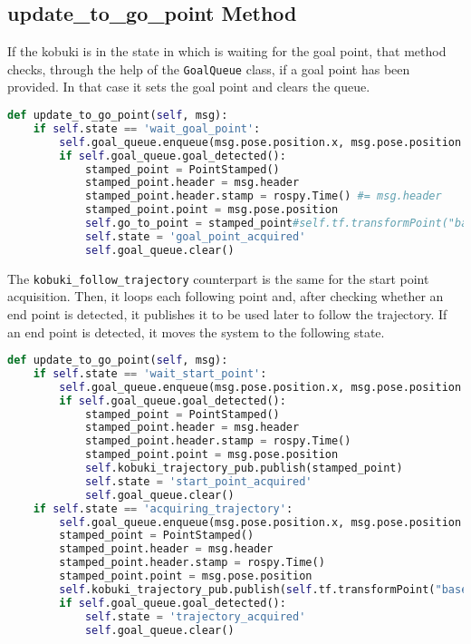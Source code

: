 \subsection*{update\_to\_go\_point Method}
If the kobuki is in the state in which is waiting for the goal point, that method checks, through the help of the \texttt{GoalQueue} class, if a goal point has been provided. In that case it sets the goal point and clears the queue.
\begin{lstlisting}[caption={Update To Go Point},label={lst:updatetogopoint},language=Python]
def update_to_go_point(self, msg):
    if self.state == 'wait_goal_point':
        self.goal_queue.enqueue(msg.pose.position.x, msg.pose.position.y)
        if self.goal_queue.goal_detected():
            stamped_point = PointStamped()
            stamped_point.header = msg.header
            stamped_point.header.stamp = rospy.Time() #= msg.header
            stamped_point.point = msg.pose.position
            self.go_to_point = stamped_point#self.tf.transformPoint("base_link", stamped_point)
            self.state = 'goal_point_acquired'
            self.goal_queue.clear()
\end{lstlisting}
The \texttt{kobuki\_follow\_trajectory} counterpart is the same for the start point acquisition. Then, it loops each following point and, after checking whether an end point is detected, it publishes it to be used later to follow the trajectory. If an end point is detected, it moves the system to the following state.
\begin{lstlisting}[caption={Update To Go Point},label={lst:updatetogopoint2},language=Python]
def update_to_go_point(self, msg):
    if self.state == 'wait_start_point':
        self.goal_queue.enqueue(msg.pose.position.x, msg.pose.position.y)
        if self.goal_queue.goal_detected():
            stamped_point = PointStamped()
            stamped_point.header = msg.header
            stamped_point.header.stamp = rospy.Time()
            stamped_point.point = msg.pose.position
            self.kobuki_trajectory_pub.publish(stamped_point)
            self.state = 'start_point_acquired'
            self.goal_queue.clear()
    if self.state == 'acquiring_trajectory':
        self.goal_queue.enqueue(msg.pose.position.x, msg.pose.position.y)
        stamped_point = PointStamped()
        stamped_point.header = msg.header
        stamped_point.header.stamp = rospy.Time()
        stamped_point.point = msg.pose.position
        self.kobuki_trajectory_pub.publish(self.tf.transformPoint("base_link", stamped_point))
        if self.goal_queue.goal_detected():
            self.state = 'trajectory_acquired'
            self.goal_queue.clear()
\end{lstlisting}
